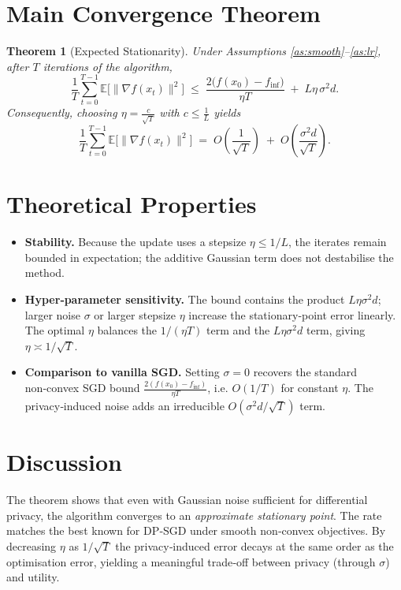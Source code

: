 \documentclass[11pt]{article}
\newtheorem{theorem}{Theorem}
\newcommand{\E}{\mathbb{E}}
\begin{document}
\section*{Main Convergence Theorem}
\begin{theorem}[Expected Stationarity]\label{thm:main}
Under Assumptions \ref{as:smooth}–\ref{as:lr}, after $T$ iterations of the algorithm,
\[
\frac{1}{T}\sum_{t=0}^{T-1}\E\!\bigl[\|\nabla f(x_t)\|^{2}\bigr]
\;\le\;
\frac{2\bigl(f(x_0)-f_{\inf}\bigr)}{\eta T}
\;+\;
L\eta\,\sigma^{2}d .
\]
Consequently, choosing $\eta =\frac{c}{\sqrt{T}}$ with $c\le \frac{1}{L}$ yields
\[
\frac{1}{T}\sum_{t=0}^{T-1}\E\!\bigl[\|\nabla f(x_t)\|^{2}\bigr]
\;=\; O\!\left(\frac{1}{\sqrt{T}}\right) \;+\; O\!\left(\frac{\sigma^{2}d}{\sqrt{T}}\right).
\]
\end{theorem}

\section*{Theoretical Properties}
\begin{itemize}
    \item \textbf{Stability.} Because the update uses a stepsize $\eta\le1/L$, the iterates remain bounded in expectation; the additive Gaussian term does not destabilise the method.
    \item \textbf{Hyper‑parameter sensitivity.} The bound contains the product $L\eta\sigma^{2}d$; larger noise $\sigma$ or larger stepsize $\eta$ increase the stationary‑point error linearly. The optimal $\eta$ balances the $1/(\eta T)$ term and the $L\eta\sigma^{2}d$ term, giving $\eta\asymp 1/\sqrt{T}$.
    \item \textbf{Comparison to vanilla SGD.} Setting $\sigma=0$ recovers the standard non‑convex SGD bound $\frac{2(f(x_0)-f_{\inf})}{\eta T}$, i.e. $O(1/T)$ for constant $\eta$. The privacy‑induced noise adds an irreducible $O(\sigma^{2}d/\sqrt{T})$ term.
\end{itemize}

\section*{Discussion}
The theorem shows that even with Gaussian noise sufficient for differential privacy, the algorithm converges to an \emph{approximate stationary point}. The rate matches the best known for DP‑SGD under smooth non‑convex objectives. By decreasing $\eta$ as $1/\sqrt{T}$ the privacy‑induced error decays at the same order as the optimisation error, yielding a meaningful trade‑off between privacy (through $\sigma$) and utility.
\end{document}
